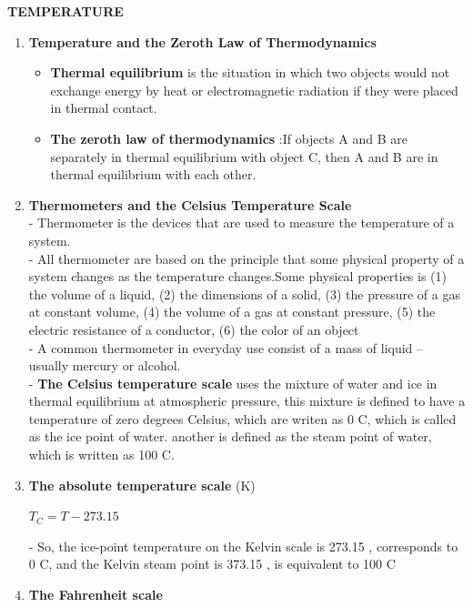 \documentclass[10pt]{article}
\begin{document}
\begin{center}
\textbf{TEMPERATURE}
\end{center}
\begin{enumerate}
	\item \textbf{Temperature and the Zeroth Law of Thermodynamics}
	\begin{itemize}
		\item \textbf{Thermal equilibrium} is the situation in which two objects would not exchange energy by heat or electromagnetic radiation if they were placed in thermal contact.
		\item \textbf{The zeroth law of thermodynamics} :If objects A and B are separately in thermal equilibrium with object C, then A and B are in thermal equilibrium with each other.
	\end{itemize}
	\item \textbf{Thermometers and the Celsius Temperature Scale}\\
	- Thermometer is the devices that are used to measure the temperature of a system.\\
	- All thermometer are based on the principle that some physical property of a system changes as the temperature changes.Some physical properties is (1) the volume of a liquid, (2) the dimensions of a solid, (3) the pressure of a gas at constant volume, (4) the volume of a gas at constant pressure, (5) the electric resistance of a conductor, (6) the color of an object\\
	- A common thermometer in  everyday use consist of a mass of liquid -- usually mercury or alcohol.\\
	- \textbf{The Celsius temperature scale} uses the mixture of water and ice in thermal equilibrium at atmospheric pressure, this mixture is defined to have a temperature of zero degrees Celsius, which are writen as 0 \degree C, which is called as the ice point of water. another is defined as the steam point of water, which is written as 100 \degree C.
	\item \textbf{The absolute temperature scale} (\degree K)
	\begin{mybox}
	\begin{center}
	$T_C = T - 273.15$
	\end{center}
	\end{mybox}
	- So, the ice-point temperature on the Kelvin scale is 273.15 \degree, corresponds to 0 \degree C, and the Kelvin steam point is 373.15 \degree, is equivalent to 100 \degree C
	\item \textbf{The Fahrenheit scale}

\end{enumerate}
\end{document}

